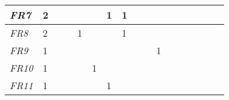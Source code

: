 \begin{table}[]
{\begin{tabular}{|l|l|l|l|l|l|l|l|l|l|l|l|l|l|l|l|l|}
\textit{FR7}  & 2                                                     &                                                       &    &                                                       &    & 1                                                     & 1                                                     &    &    &                                                       &    &                                                  &                                                  &    &    &    \\ \hline
\textit{FR8}  & 2                                                     &                                                       &    & 1                                                     &    &                                                       & 1                                                     &    &    &                                                       &    &                                                  &                                                  &    &    &    \\ \hline
\textit{FR9}  & 1                                                     &                                                       &    &                                                       &    &                                                       &                                                       &    &    & 1                                                     &    &                                                  &                                                  &    &    &    \\ \hline
\textit{FR10} & 1                                                     &                                                       &    &                                                       & 1  &                                                       &                                                       &    &    &                                                       &    &                                                  &                                                  &    &    &    \\ \hline
\textit{FR11} & 1                                                     &                                                       &    &                                                       &    & 1                                                     &                                                       &    &    &                                                       &    &                                                  &                                                  &    &    &    \\ \hline

\end{tabular}}
\end{table}
